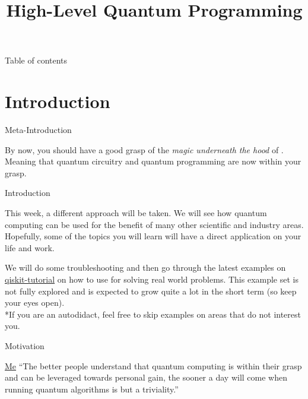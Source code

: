 \documentclass[aspectratio=43]{beamer}
\title{High-Level Quantum Programming}
\begin{document}
\begin{frame}
    \titlepage
\end{frame}


\begin{frame}{Table of contents}
    \begin{card}
        \tableofcontents
    \end{card}
\end{frame}


\section{Introduction}
\begin{frame}{Meta-Introduction}
    \begin{card}
        By now, you should have a good grasp of the \textit{magic underneath the hood} of \qc. Meaning that quantum circuitry and quantum programming are now within your grasp.
    \end{card}
\pagenumber
\end{frame}

\begin{frame}{Introduction}
    \begin{cardTiny}
        This week, a different approach will be taken. We will see how quantum computing can be used for the benefit of many other scientific and industry areas. Hopefully, some of the topics you will learn will have a direct application on your life and work. 
    \end{cardTiny}
    \begin{cardTiny}
        We will do some \qka troubleshooting and then go through the latest examples on \href{https://github.com/Qiskit/qiskit-tutorial}{qiskit-tutorial} on how to use \qsa for solving real world problems. This example set is not fully explored and is expected to grow quite a lot in the short term (so keep your eyes open).\\
        \small{*If you are an autodidact, feel free to skip examples on areas that do not interest you.}
    \end{cardTiny}
\pagenumber
\end{frame}

\begin{frame}{Motivation}
    \begin{card}
    \begin{chapquote}[2pt]{\href{https://msramalho.github.io/}{Me}}
        ``The better people understand that quantum computing is within their grasp and can be leveraged towards personal gain, the sooner a day will come when running quantum algorithms is but a triviality.''
    \end{chapquote}
    \end{card}
\pagenumber
\end{frame}
\end{document}
